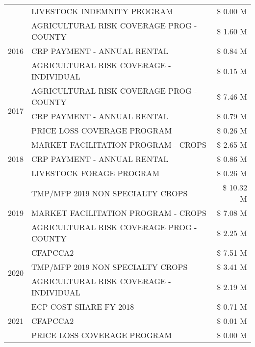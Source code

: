 \begin{tabular}{llr}
 & LIVESTOCK INDEMNITY PROGRAM & \$ 0.00 M \\
\cline{1-3}
\multirow[t]{3}{*}{2016} & AGRICULTURAL RISK COVERAGE PROG - COUNTY & \$ 1.60 M \\
 & CRP PAYMENT - ANNUAL RENTAL & \$ 0.84 M \\
 & AGRICULTURAL RISK COVERAGE - INDIVIDUAL & \$ 0.15 M \\
\cline{1-3}
\multirow[t]{3}{*}{2017} & AGRICULTURAL RISK COVERAGE PROG - COUNTY & \$ 7.46 M \\
 & CRP PAYMENT - ANNUAL RENTAL & \$ 0.79 M \\
 & PRICE LOSS COVERAGE PROGRAM & \$ 0.26 M \\
\cline{1-3}
\multirow[t]{3}{*}{2018} & MARKET FACILITATION PROGRAM - CROPS & \$ 2.65 M \\
 & CRP PAYMENT - ANNUAL RENTAL & \$ 0.86 M \\
 & LIVESTOCK FORAGE PROGRAM & \$ 0.26 M \\
\cline{1-3}
\multirow[t]{3}{*}{2019} & TMP/MFP 2019 NON SPECIALTY CROPS & \$ 10.32 M \\
 & MARKET FACILITATION PROGRAM - CROPS & \$ 7.08 M \\
 & AGRICULTURAL RISK COVERAGE PROG - COUNTY & \$ 2.25 M \\
\cline{1-3}
\multirow[t]{3}{*}{2020} & CFAPCCA2 & \$ 7.51 M \\
 & TMP/MFP 2019 NON SPECIALTY CROPS & \$ 3.41 M \\
 & AGRICULTURAL RISK COVERAGE - INDIVIDUAL & \$ 2.19 M \\
\cline{1-3}
\multirow[t]{3}{*}{2021} & ECP COST SHARE FY 2018 & \$ 0.71 M \\
 & CFAPCCA2 & \$ 0.01 M \\
 & PRICE LOSS COVERAGE PROGRAM & \$ 0.00 M \\
\cline{1-3}
\bottomrule
\end{tabular}
